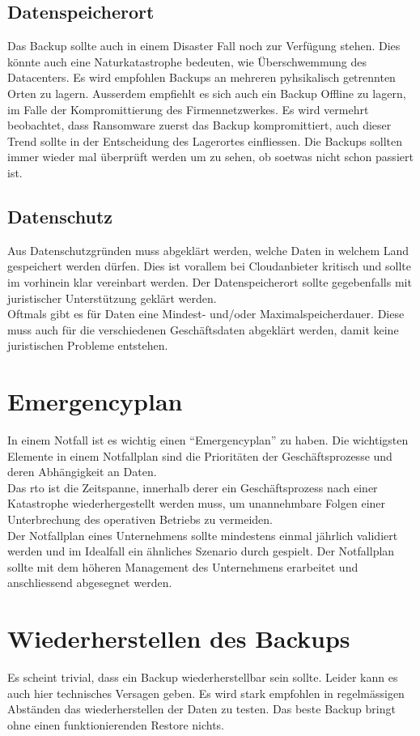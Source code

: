 \subsection{Datenspeicherort}
Das Backup sollte auch in einem Disaster Fall noch zur Verfügung stehen.
Dies könnte auch eine Naturkatastrophe bedeuten, wie Überschwemmung des Datacenters.
Es wird empfohlen Backups an mehreren pyhsikalisch getrennten Orten zu lagern.
Ausserdem empfiehlt es sich auch ein Backup Offline zu lagern, im Falle der Kompromittierung des Firmennetzwerkes.
Es wird vermehrt beobachtet, dass Ransomware zuerst das Backup kompromittiert, auch dieser Trend sollte in der Entscheidung des Lagerortes einfliessen.
Die Backups sollten immer wieder mal überprüft werden um zu sehen, ob soetwas nicht schon passiert ist.



\subsection{Datenschutz}
Aus Datenschutzgründen muss abgeklärt werden, welche Daten in welchem Land gespeichert werden dürfen.
Dies ist vorallem bei Cloudanbieter kritisch und sollte im vorhinein klar vereinbart werden.
Der Datenspeicherort sollte gegebenfalls mit juristischer Unterstützung geklärt werden.\\

Oftmals gibt es für Daten eine Mindest- und/oder Maximalspeicherdauer. 
Diese muss auch für die verschiedenen Geschäftsdaten abgeklärt werden, damit keine juristischen Probleme entstehen. 

\section{Emergencyplan}
In einem Notfall ist es wichtig einen ``Emergencyplan'' zu haben.
Die wichtigsten Elemente in einem Notfallplan sind die Prioritäten der Geschäftsprozesse und deren Abhängigkeit an Daten.\\


Das \acrfull{rto} ist die Zeitspanne, innerhalb derer ein Geschäftsprozess nach einer Katastrophe wiederhergestellt werden muss, um unannehmbare Folgen einer Unterbrechung des operativen Betriebs zu vermeiden.\\

Der Notfallplan eines Unternehmens sollte mindestens einmal jährlich validiert werden und im Idealfall ein ähnliches Szenario durch gespielt.
Der Notfallplan sollte mit dem höheren Management des Unternehmens erarbeitet und anschliessend abgesegnet werden.


\section{Wiederherstellen des Backups}
Es scheint trivial, dass ein Backup wiederherstellbar sein sollte.
Leider kann es auch hier technisches Versagen geben.
Es wird stark empfohlen in regelmässigen Abständen das wiederherstellen der Daten zu testen.
Das beste Backup bringt ohne einen funktionierenden Restore nichts.